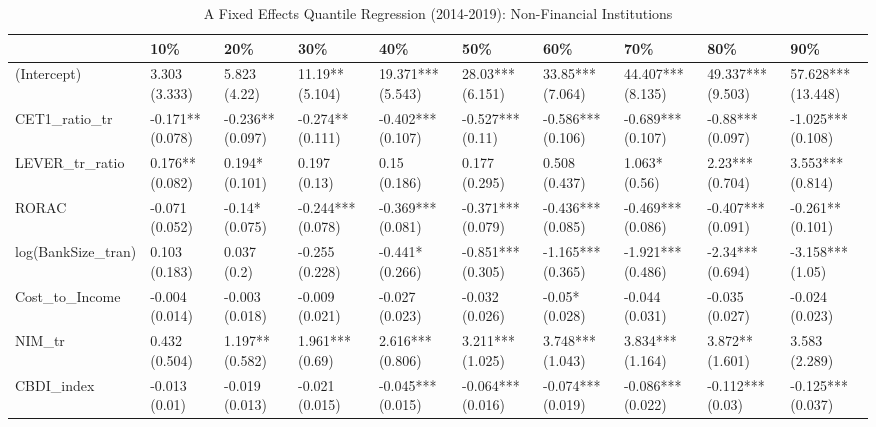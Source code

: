 \begin{table}[ht]
\centering
\caption{A Fixed Effects Quantile Regression (2014-2019): Non-Financial Institutions} 
\begingroup\small
\begin{tabular}{llllllllll}
  \toprule
 & 10\% & 20\% & 30\% & 40\% & 50\% & 60\% & 70\% & 80\% & 90\% \\ 
  \midrule
(Intercept) & 3.303 (3.333) & 5.823 (4.22) & 11.19** (5.104) & 19.371*** (5.543) & 28.03*** (6.151) & 33.85*** (7.064) & 44.407*** (8.135) & 49.337*** (9.503) & 57.628*** (13.448) \\ 
  CET1\_ratio\_tr & -0.171** (0.078) & -0.236** (0.097) & -0.274** (0.111) & -0.402*** (0.107) & -0.527*** (0.11) & -0.586*** (0.106) & -0.689*** (0.107) & -0.88*** (0.097) & -1.025*** (0.108) \\ 
  LEVER\_tr\_ratio & 0.176** (0.082) & 0.194* (0.101) & 0.197 (0.13) & 0.15 (0.186) & 0.177 (0.295) & 0.508 (0.437) & 1.063* (0.56) & 2.23*** (0.704) & 3.553*** (0.814) \\ 
  RORAC & -0.071 (0.052) & -0.14* (0.075) & -0.244*** (0.078) & -0.369*** (0.081) & -0.371*** (0.079) & -0.436*** (0.085) & -0.469*** (0.086) & -0.407*** (0.091) & -0.261** (0.101) \\ 
  log(BankSize\_tran) & 0.103 (0.183) & 0.037 (0.2) & -0.255 (0.228) & -0.441* (0.266) & -0.851*** (0.305) & -1.165*** (0.365) & -1.921*** (0.486) & -2.34*** (0.694) & -3.158*** (1.05) \\ 
  Cost\_to\_Income & -0.004 (0.014) & -0.003 (0.018) & -0.009 (0.021) & -0.027 (0.023) & -0.032 (0.026) & -0.05* (0.028) & -0.044 (0.031) & -0.035 (0.027) & -0.024 (0.023) \\ 
  NIM\_tr & 0.432 (0.504) & 1.197** (0.582) & 1.961*** (0.69) & 2.616*** (0.806) & 3.211*** (1.025) & 3.748*** (1.043) & 3.834*** (1.164) & 3.872** (1.601) & 3.583 (2.289) \\ 
  CBDI\_index & -0.013 (0.01) & -0.019 (0.013) & -0.021 (0.015) & -0.045*** (0.015) & -0.064*** (0.016) & -0.074*** (0.019) & -0.086*** (0.022) & -0.112*** (0.03) & -0.125*** (0.037) \\ 
   \bottomrule
\end{tabular}
\endgroup
\end{table}
